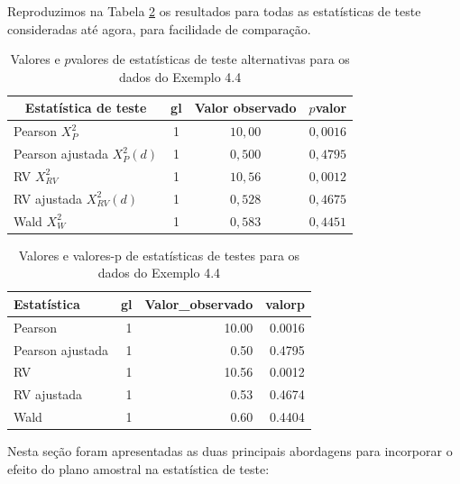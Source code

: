 \documentclass[]{book}
\numberwithin{example}{chapter}
\numberwithin{remark}{chapter}
\numberwithin{definition}{chapter}
\begin{document}
Reproduzimos na Tabela \ref{tab:testprop} os resultados para todas as
estatísticas de teste consideradas até agora, para facilidade de
comparação.

\begin{center}
\begin{table}[tbp] \centering%
\caption{Valores e $p$valores de estatísticas de teste alternativas para os
dados do Exemplo 4.4}\bigskip \label{tab72} 
\begin{tabular}{|c|c|c|c|}
\hline\hline
Estatística de teste & gl & Valor observado & $p$valor \\ \hline\hline
\multicolumn{1}{|l|}{Pearson $X_{P}^{2}$} & 1 & $10,00$ & $0,0016$ \\ 
\multicolumn{1}{|l|}{Pearson ajustada $X_{P}^{2}\left( d\right)$} & 1 & $%
0,500$ & $0,4795$ \\ 
\multicolumn{1}{|l|}{RV $X_{RV}^{2}$} & 1 & $10,56$ & $0,0012$ \\ 
\multicolumn{1}{|l|}{RV ajustada $X_{RV}^{2}(d)$} & 1 & $0,528$ & $0,4675$
\\ 
\multicolumn{1}{|l|}{Wald $X_{W}^{2}$} & 1 & $0,583$ & $0,4451$ \\ 
\hline\hline
\end{tabular}
\end{table}%
\end{center}

\begin{table}

\caption{\label{tab:testprop}Valores e valores-p de estatísticas de testes para os dados do Exemplo 4.4}
\centering
\begin{tabular}[t]{lrrr}
\toprule
Estatística & gl & Valor\_observado & valorp\\
\midrule
Pearson & 1 & 10.00 & 0.0016\\
Pearson ajustada & 1 & 0.50 & 0.4795\\
RV & 1 & 10.56 & 0.0012\\
RV ajustada & 1 & 0.53 & 0.4674\\
Wald & 1 & 0.60 & 0.4404\\
\bottomrule
\end{tabular}
\end{table}

Nesta seção foram apresentadas as duas principais abordagens para
incorporar o efeito do plano amostral na estatística de teste:
\end{document}
